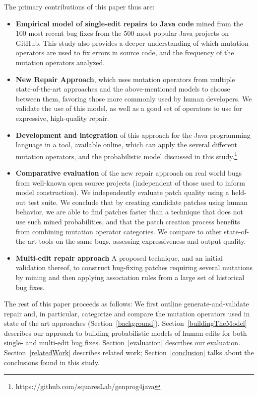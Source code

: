 \documentclass[conference]{IEEEtran}
\begin{document}
%
The primary contributions of this paper thus are:
\begin{itemize}
\item \textbf{Empirical model of single-edit repairs to Java code} mined
      from the 100 most recent bug fixes from the 500 most popular Java projects on
    GitHub. This study also provides a deeper
    understanding of which mutation operators are used to fix
    errors in source code, and the frequency of the mutation operators
    analyzed. 
	\item \textbf{New Repair Approach}, which uses mutation operators
    from multiple state-of-the-art approaches and
    the above-mentioned models to choose between them, favoring those more commonly
    used by human developers.  We validate the use of this model, as well as a
    good set of operators to use for expressive, high-quality repair.
    \item \textbf{Development and integration} of this approach for the Java
      programming language in a tool, available online, which can apply the
      several different mutation operators, and the probabilistic model
      discussed in this study.\footnote{https://github.com/squaresLab/genprog4java}
  \item \textbf{Comparative evaluation} of the new repair approach on real world bugs from well-known open source projects (independent of those used to inform model
    construction). We independently evaluate patch quality using a held-out test
    suite. We conclude that by creating candidate patches using human behavior,
    we are able to find patches faster than a technique that does not use such
    mined probabilities, and that the patch creation
    process benefits from combining mutation operator categories. We compare to
    other state-of-the-art tools on the same bugs, assessing expressiveness and
    output quality. 
  \item \textbf{Multi-edit repair approach} A proposed technique, and an initial
    validation thereof, to construct 
    bug-fixing patches requiring several mutations by mining and then applying association
    rules from a large set of historical bug fixes. 
\end{itemize}

The rest of this paper proceeds as follows: We first outline
generate-and-validate repair and, in particular, 
categorize and compare the mutation operators used in state of the art
approaches (Section~\ref{background}). Section~\ref{buildingTheModel}
describes our approach to building probabilistic models of human 
edits for both single- and multi-edit bug fixes. Section~\ref{evaluation}
describes our evaluation. Section~\ref{relatedWork} describes
related work; Section~\ref{conclusion} talks about the conclusions found in this study. 
\end{document}

